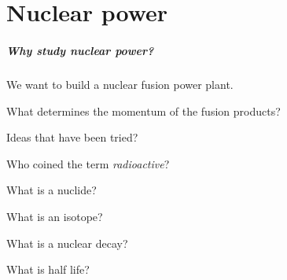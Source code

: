 \chapter{Nuclear power}


\cite{harms2000principles}

\paragraph{Why study nuclear power?}
We want to build a nuclear fusion power plant.










What determines the momentum of the fusion products?

Ideas that have been tried?

Who coined the term \emph{radioactive}?

What is a nuclide?

What is an isotope?

What is a nuclear decay?

What is half life?

